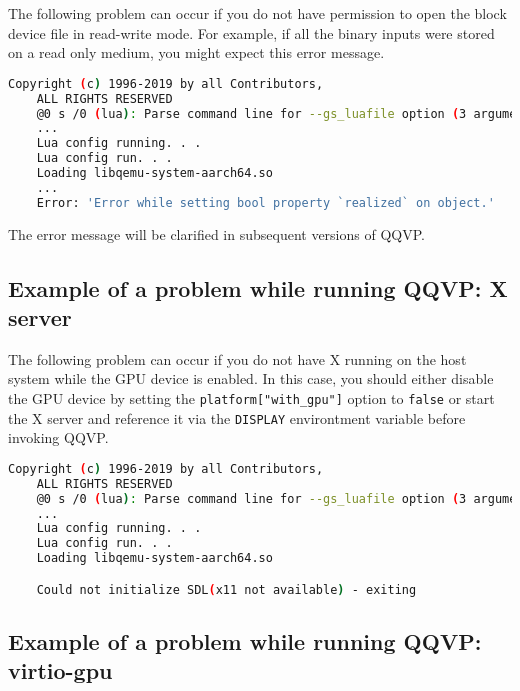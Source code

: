 The following problem can occur if you do not have permission to open the block device file in read-write mode. For example, if all the binary inputs were stored on a read only medium, you might expect this error message.

\small
\begin{lstlisting}[language=bash]
    Copyright (c) 1996-2019 by all Contributors,
    ALL RIGHTS RESERVED
    @0 s /0 (lua): Parse command line for --gs_luafile option (3 arguments)
    ...
    Lua config running. . .
    Lua config run. . .
    Loading libqemu-system-aarch64.so
    ...
    Error: 'Error while setting bool property `realized` on object.'
\end{lstlisting}
\normalsize

\note The error message will be clarified in subsequent versions of QQVP.

\subsection{Example of a problem while running QQVP: X server}

The following problem can occur if you do not have X running on the host
system while the GPU device is enabled.  In this case, you should either
disable the GPU device by setting the {\small{\lstinline!platform["with_gpu"]!}}
option to {\small{\lstinline!false!}} or start the X server and reference
it via the {\small{\lstinline!DISPLAY!}} environtment variable before invoking
QQVP.

\small
\begin{lstlisting}[language=bash]
    Copyright (c) 1996-2019 by all Contributors,
    ALL RIGHTS RESERVED
    @0 s /0 (lua): Parse command line for --gs_luafile option (3 arguments)
    ...
    Lua config running. . .
    Lua config run. . .
    Loading libqemu-system-aarch64.so

    Could not initialize SDL(x11 not available) - exiting
\end{lstlisting}
\normalsize

\subsection{Example of a problem while running QQVP: virtio-gpu}

